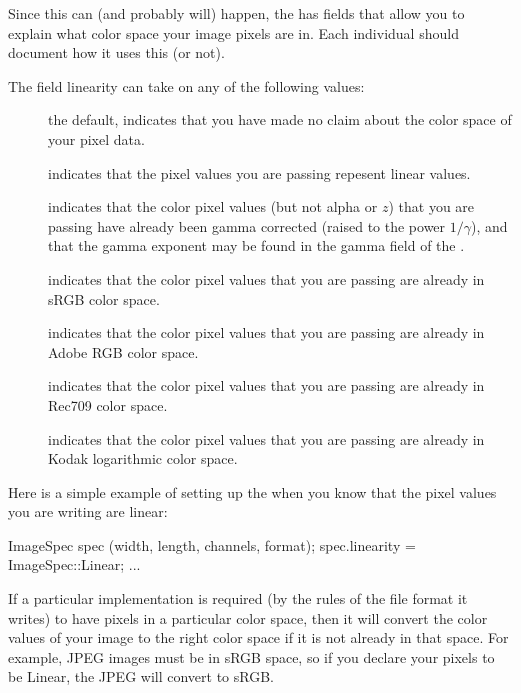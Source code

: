 Since this can (and probably will) happen, the \ImageSpec has
fields that allow you to explain what color space your image pixels are
in.  Each individual \ImageOutput should document how it uses this (or
not).

The \ImageSpec field {\cf linearity} can take on any of the
following values:
\begin{description}
\item[\halfspc \rm {}] the default,
  indicates that you have made no claim about the color space of your
  pixel data.
\item[\halfspc \rm {}] indicates that the pixel
  values you are passing repesent linear values.
\item[\halfspc \rm {}] indicates that the
  color pixel values (but not alpha or $z$) that you are passing have
  already been gamma corrected (raised to the power $1/\gamma$), and
  that the gamma exponent may be found in the {\cf gamma} field of the
  \ImageSpec.
\item[\halfspc \rm {}] indicates that the color pixel
  values that you are passing are already in sRGB color space.
\item[\halfspc \rm {}] indicates that the color pixel
  values that you are passing are already in Adobe RGB color space.
\item[\halfspc \rm {}] indicates that the color pixel
  values that you are passing are already in Rec709 color space.
\item[\halfspc \rm {}] indicates that the color pixel
  values that you are passing are already in Kodak logarithmic color space.
\end{description}

\noindent Here is a simple example of setting up the \ImageSpec
when you know that the pixel values you are writing are linear:

\begin{code}
        ImageSpec spec (width, length, channels, format);
        spec.linearity = ImageSpec::Linear;
        ...
\end{code}

If a particular \ImageOutput implementation is required (by the rules of
the file format it writes) to have pixels in a particular color space,
then it will convert the color values of your image to the right color
space if it is not already in that space.  For example, JPEG images
must be in sRGB space, so if you declare your pixels to be {\kw Linear},
the JPEG \ImageOutput will convert to sRGB.

